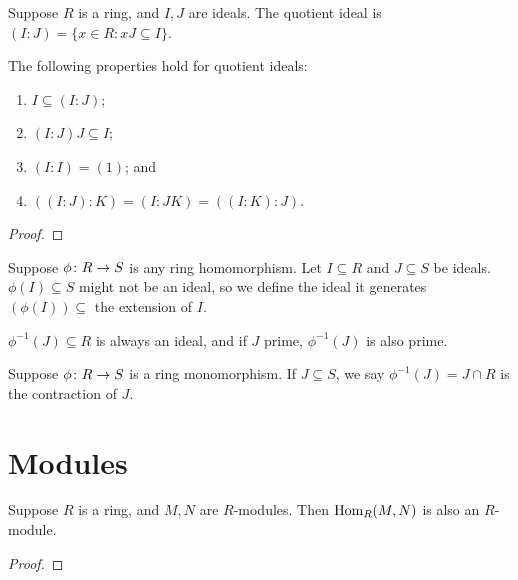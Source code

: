 \begin{definition}
    Suppose \(R\) is a ring, and \(I,J\) are ideals.
    The quotient ideal is \((I:J) = \{x \in R : xJ \subseteq I\}\).
\end{definition}
\begin{proposition}
    The following properties hold for quotient ideals:
    \begin{enumerate}[label={(\alph*)}, itemsep=0mm]
        \item \(I \subseteq (I:J)\);
        \item \((I:J)J \subseteq I\);
        \item \((I:I) = (1)\); and
        \item \(((I:J):K) = (I:JK) = ((I:K):J)\).
    \end{enumerate}
\end{proposition}
\begin{proof}
    
\end{proof}

\begin{definition}
    Suppose \(\phi\colon R\to S\) is any ring homomorphism.
    Let \(I \subseteq R\) and \(J \subseteq S\) be ideals.
    \(\phi(I) \subseteq S\) might not be an ideal,
    so we define the ideal it generates \((\phi(I)) \subseteq \) the extension of \(I\).
\end{definition}
\begin{remark}
    \(\phi^{-1}(J) \subseteq R\) is always an ideal,
    and if \(J\) prime, \(\phi^{-1}(J)\) is also prime.
\end{remark}
\begin{definition}
    Suppose \(\phi\colon R\to S\) is a ring monomorphism.
    If \(J \subseteq S\), we say \(\phi^{-1}(J) = J \cap R\) is the contraction of \(J\).
\end{definition}


\section{Modules}\label{sec:comm-modules}

\begin{proposition}
    Suppose \(R\) is a ring, and \(M,N\) are \(R\)-modules.
    Then \(\operatorname{Hom}_R(M,N)\) is also an \(R\)-module.
\end{proposition}
\begin{proof}
    
\end{proof}

